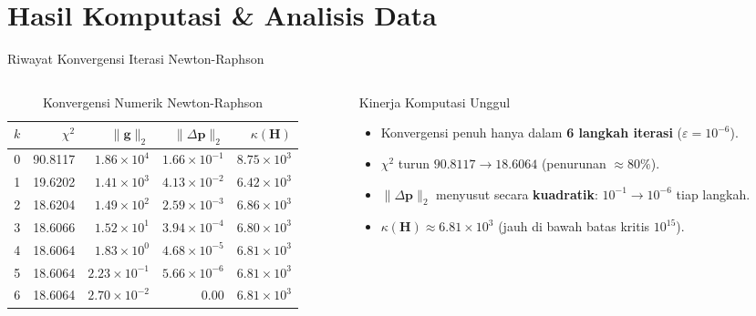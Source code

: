 \documentclass[aspectratio=169, 10pt]{beamer}
\begin{document}
\section{Hasil Komputasi \& Analisis Data}

\begin{frame}{Riwayat Konvergensi Iterasi Newton-Raphson}
	\begin{columns}[T]
		\begin{column}{0.55\textwidth}
			\begin{table}
				\centering
				\scriptsize
				\setlength{\tabcolsep}{5pt}
				\caption{Konvergensi Numerik Newton-Raphson}
				\begin{tabular}{c r r r r}
					\toprule
					$k$ & $\chi^2$ & $\|\mathbf{g}\|_2$ & $\|\Delta\mathbf{p}\|_2$ & $\kappa(\mathbf{H})$ \\
					\midrule
					0 & 90.8117 & $1.86\times10^{4}$ & $1.66\times10^{-1}$ & $8.75\times10^{3}$ \\
					1 & 19.6202 & $1.41\times10^{3}$ & $4.13\times10^{-2}$ & $6.42\times10^{3}$ \\
					2 & 18.6204 & $1.49\times10^{2}$ & $2.59\times10^{-3}$ & $6.86\times10^{3}$ \\
					3 & 18.6066 & $1.52\times10^{1}$ & $3.94\times10^{-4}$ & $6.80\times10^{3}$ \\
					4 & 18.6064 & $1.83\times10^{0}$ & $4.68\times10^{-5}$ & $6.81\times10^{3}$ \\
					5 & 18.6064 & $2.23\times10^{-1}$ & $5.66\times10^{-6}$ & $6.81\times10^{3}$ \\
					6 & 18.6064 & $2.70\times10^{-2}$ & $0.00$ & $6.81\times10^{3}$ \\
					\bottomrule
				\end{tabular}
			\end{table}
		\end{column}

		\begin{column}{0.45\textwidth}
			\begin{alertblock}{Kinerja Komputasi Unggul}
				\small
				\begin{itemize}
					\item Konvergensi penuh hanya dalam \textbf{6 langkah iterasi} ($\varepsilon = 10^{-6}$).
					\item $\chi^2$ turun $90.8117 \to 18.6064$ (penurunan $\approx 80\%$).
					\item $\|\Delta\mathbf{p}\|_2$ menyusut secara \textbf{kuadratik}: $10^{-1} \to 10^{-6}$ tiap langkah.
					\item $\kappa(\mathbf{H}) \approx 6.81\times10^3$ (jauh di bawah batas kritis $10^{15}$).
				\end{itemize}
			\end{alertblock}
		\end{column}
	\end{columns}
\end{frame}
\end{document}
